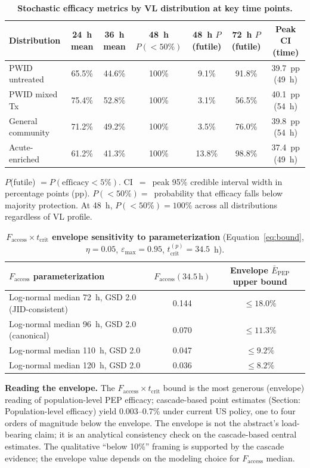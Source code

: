 \documentclass[11pt]{article}
\theoremstyle{definition}
\theoremstyle{remark}
\newcommand{\Ebarpep}{\bar{E}_{\text{PEP}}}
\newcommand{\Faccess}{F_{\text{access}}}
\newcommand{\tcrit}{t_{\text{crit}}}
\newcommand{\emax}{\varepsilon_{\max}}
\begin{document}
\begin{table}[H]
\centering
\caption{\textbf{Stochastic efficacy metrics by VL distribution at key time points.}}
\label{tab:stochastic}
\small
\begin{tabular}{@{}lcccccc@{}}
\toprule
\textbf{Distribution} & \textbf{24~h mean} & \textbf{36~h mean} & \textbf{48~h $P(<50\%)$} & \textbf{48~h $P$(futile)} & \textbf{72~h $P$(futile)} & \textbf{Peak CI (time)} \\
\midrule
PWID untreated      & 65.5\% & 44.6\% & 100\% & 9.1\%  & 91.8\% & 39.7~pp (49~h) \\
PWID mixed Tx       & 75.4\% & 52.8\% & 100\% & 3.1\%  & 56.5\% & 40.1~pp (54~h) \\
General community   & 71.2\% & 49.2\% & 100\% & 3.5\%  & 76.0\% & 39.8~pp (54~h) \\
Acute-enriched      & 61.2\% & 41.3\% & 100\% & 13.8\% & 98.8\% & 37.4~pp (49~h) \\
\bottomrule
\end{tabular}

\vspace{0.3em}
\footnotesize
$P$(futile) $= P(\text{efficacy} < 5\%)$. CI~$=$~peak 95\% credible interval width in percentage points (pp). $P(<50\%) =$~probability that efficacy falls below majority protection. At 48~h, $P(<50\%) = 100\%$ across all distributions regardless of VL profile.
\end{table}

\begin{table}[H]
\centering
\caption{\textbf{$\Faccess \times \tcrit$ envelope sensitivity to parameterization} (Equation~\ref{eq:bound}, $\eta = 0.05$, $\emax = 0.95$, $\tcrit^{(p)} = 34.5$~h).}
\label{tab:bound}
\small
\begin{tabular}{@{}lcc@{}}
\toprule
\textbf{$\Faccess$ parameterization} & \textbf{$\Faccess(34.5\,\text{h})$} & \textbf{Envelope $\Ebarpep$ upper bound} \\
\midrule
Log-normal median 72~h, GSD 2.0 (JID-consistent)  & 0.144 & $\leq 18.0\%$ \\
Log-normal median 96~h, GSD 2.0 (canonical)       & 0.070 & $\leq 11.3\%$ \\
Log-normal median 110~h, GSD 2.0                  & 0.047 & $\leq 9.2\%$  \\
Log-normal median 120~h, GSD 2.0                  & 0.036 & $\leq 8.2\%$  \\
\bottomrule
\end{tabular}

\vspace{0.3em}
\footnotesize
\textbf{Reading the envelope.} The $\Faccess \times \tcrit$ bound is the most generous (envelope) reading of population-level PEP efficacy; cascade-based point estimates (Section: Population-level efficacy) yield 0.003--0.7\% under current US policy, one to four orders of magnitude below the envelope. The envelope is not the abstract's load-bearing claim; it is an analytical consistency check on the cascade-based central estimates. The qualitative ``below 10\%'' framing is supported by the cascade evidence; the envelope value depends on the modeling choice for $\Faccess$ median.
\end{table}
\end{document}
